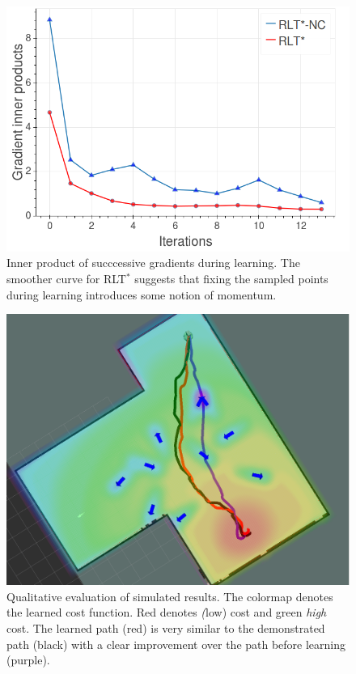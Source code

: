 \documentclass[letterpaper, 10 pt, conference]{ieeeconf}
\begin{document}
 	\begin{figure}[tbh]
	\centering
    \includegraphics[scale=0.23]{images/momentum.png}
    \caption{Inner product of succcessive gradients during learning. The smoother curve for RLT$^*$ suggests that fixing the sampled points during learning introduces some notion of momentum. }
    \vspace{-2mm}
  \label{fig:in_prod_grad}
  \end{figure}


	\begin{figure}[tbh]
	\centering
    \includegraphics[scale=0.15]{images/kino_paths.png}
    \caption{Qualitative evaluation of simulated results. The colormap denotes the learned cost function. Red denotes \emph(low) cost and green \emph{high} cost. The learned path (red) is very similar to the demonstrated path (black) with a clear improvement over the path before learning (purple).}
    \vspace{-2mm}
  \label{fig:results_qual}
  \end{figure}
\end{document}
